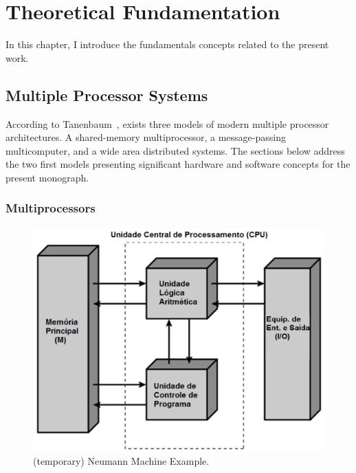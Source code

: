 \chapter{Theoretical Fundamentation} %
\label{ch.fundamentation}

	In this chapter, I introduce the fundamentals concepts related to the present work.



\section{Multiple Processor Systems}
\label{sec.multiple_processor_systems}

	According to Tanenbaum~\cite{tanenbaum:4ed}, exists three models of modern
	multiple processor architectures.
	A shared-memory multiprocessor, a message-passing multicomputer, and a wide
	area distributed systems.
	The sections below address the two first models presenting significant
	hardware and software concepts for the present monograph.

	\subsection{Multiprocessors}
	\label{sec.multiprocessors}

		\begin{figure}[h]
			\centering
			\includegraphics[width=.6\textwidth]{images/neumann.jpg}

			\caption{
				(temporary) Neumann Machine Example.
			}\par
			\label{fig.neumann}
		\end{figure}


